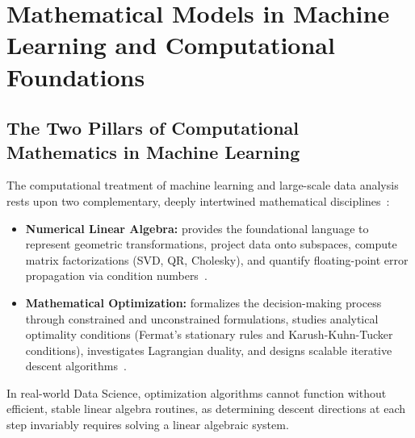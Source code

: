 \chapter{Mathematical Models in Machine Learning and Computational Foundations}
\label{chap:computational-models}

\FloatBarrier
\section{The Two Pillars of Computational Mathematics in Machine Learning}

The computational treatment of machine learning and large-scale data analysis rests upon two complementary, deeply intertwined mathematical disciplines~\cite{strang2019linear}:
\begin{itemize}
    \item \textbf{Numerical Linear Algebra:} provides the foundational language to represent geometric transformations, project data onto subspaces, compute matrix factorizations (SVD, QR, Cholesky), and quantify floating-point error propagation via condition numbers~\cite{trefethen1997numerical,demmel1997applied}.
    \item \textbf{Mathematical Optimization:} formalizes the decision-making process through constrained and unconstrained formulations, studies analytical optimality conditions (Fermat's stationary rules and Karush-Kuhn-Tucker conditions), investigates Lagrangian duality, and designs scalable iterative descent algorithms~\cite{boyd2004convex,nocedal2006numerical,bazaraa2006nonlinear}.
\end{itemize}

In real-world Data Science, optimization algorithms cannot function without efficient, stable linear algebra routines, as determining descent directions at each step invariably requires solving a linear algebraic system.

